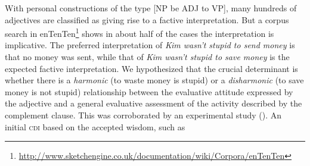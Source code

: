 \documentclass[10pt]{article}
\begin{document}
%


With personal constructions of the type [NP be ADJ to VP], many hundreds of adjectives are classified as giving rise to a factive interpretation. But a corpus search in enTenTen\footnote{\url{http://www.sketchengine.co.uk/documentation/wiki/Corpora/enTenTen}} shows in about half of the cases the interpretation is implicative. The preferred interpretation of \textit{Kim wasn't stupid to send money} is that no money was sent, while that of \textit{Kim wasn't stupid to save money} is the expected factive interpretation. We hypothesized that the crucial determinant is whether there is a \emph{harmonic} (to waste money is stupid) or a \emph{disharmonic} (to save money is not stupid) relationship between the evaluative attitude expressed by the adjective and a general evaluative assessment of the activity described by the complement clause. This was corroborated by an experimental study (\cite{csli-gang-cssp13}). An initial \textsc{cdi} based on the accepted wisdom, such as 
\end{document}
